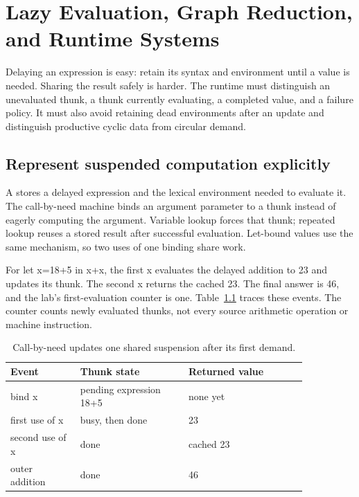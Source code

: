 \chapter{Lazy Evaluation, Graph Reduction, and Runtime Systems}
\label{ch:lazy-functional-runtime}

Delaying an expression is easy: retain its syntax and environment until a value is needed.
Sharing the result safely is harder.
The runtime must distinguish an unevaluated thunk, a thunk currently evaluating, a completed value, and a failure policy.
It must also avoid retaining dead environments after an update and distinguish productive cyclic data from circular demand.

\section{Represent suspended computation explicitly}
\label{sec:ch92-thunks}
A  stores a delayed expression and the lexical environment needed to evaluate it.
The call-by-need machine binds an argument parameter to a thunk instead of eagerly computing the argument.
Variable lookup forces that thunk; repeated lookup reuses a stored result after successful evaluation.
Let-bound values use the same mechanism, so two uses of one binding share work.

For let x=18+5 in x+x, the first x evaluates the delayed addition to 23 and updates its thunk.
The second x returns the cached 23.
The final answer is 46, and the lab's first-evaluation counter is one.
Table~\ref{tab:ch92-sharing} traces these events.
The counter counts newly evaluated thunks, not every source arithmetic operation or machine instruction.

\begin{table}[htbp]
\caption{Call-by-need updates one shared suspension after its first demand.}
\label{tab:ch92-sharing}
\centering
\begin{tabular}{p{0.20\linewidth}p{0.31\linewidth}p{0.34\linewidth}}
\toprule
Event & Thunk state & Returned value \\
\midrule
bind x & pending expression 18+5 & none yet \\
first use of x & busy, then done & 23 \\
second use of x & done & cached 23 \\
outer addition & done & 46 \\
\bottomrule
\end{tabular}
\end{table}

